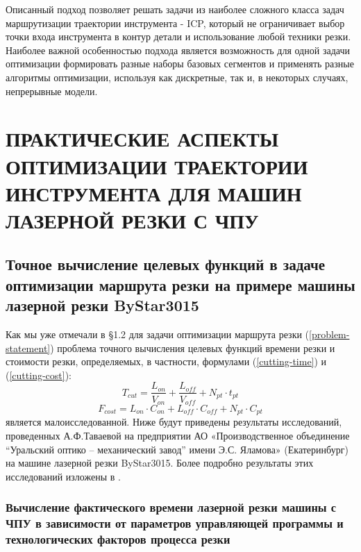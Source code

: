 \documentclass[12pt,twoside]{report}
\newcounter{lem}
\begin{document}
Описанный подход позволяет решать задачи из
наиболее сложного класса задач маршрутизации
траектории инструмента - ICP,
который не ограничивает выбор точки входа
инструмента в контур детали и использование
любой техники резки.
Наиболее важной особенностью подхода
является возможность для одной задачи оптимизации
формировать разные наборы базовых сегментов и
применять разные алгоритмы оптимизации,
используя как дискретные, так и,
в некоторых случаях, непрерывные модели.
















\chapter{ПРАКТИЧЕСКИЕ АСПЕКТЫ ОПТИМИЗАЦИИ ТРАЕКТОРИИ ИНСТРУМЕНТА ДЛЯ МАШИН ЛАЗЕРНОЙ РЕЗКИ С ЧПУ}
\setcounter{chapter}{2}
\setcounter{equation}{0}

\section{Точное вычисление целевых функций в задаче оптимизации маршрута резки на примере машины лазерной резки ByStar3015}

Как мы уже  отмечали в \S 1.2
для задачи оптимизации маршрута резки (\ref{problem-statement})
проблема точного вычисления целевых функций времени резки и стоимости резки,
определяемых, в частности, формулами (\ref{cutting-time}) и (\ref{cutting-cost}):
$$
T_{cut} = \frac{L_{on}}{V_{on}} + \frac{L_{off}}{V_{off}} +N_{pt} \cdot t_{pt}
$$
$$
F_{cost}=
L_{on} \cdot C_{on} +
L_{off} \cdot C_{off} +
N_{pt} \cdot C_{pt}
$$
является малоисследованной.
Ниже будут приведены результаты исследований,
проведенных А.Ф.Таваевой на предприятии
АО «Производственное объединение “Уральский оптико – механический завод”
имени Э.С. Яламова» (Екатеринбург)
на машине лазерной резки ByStar3015.
Более подробно результаты этих исследований изложены в
\cite{intro45,intro46,intro47}.

\subsection{Вычисление фактического времени лазерной резки машины с ЧПУ
в зависимости от параметров управляющей программы и технологических факторов процесса резки}
\end{document}
